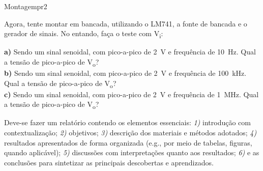 \begin{problem}{Montagem}{pr2}

Agora, tente montar em bancada, utilizando o LM741, a fonte de bancada e o gerador de sinais. No entando, faça o teste com V\textsubscript{i}:

\textbf{a)} Sendo um sinal senoidal, com pico-a-pico de \SI{2}{\volt} e frequência de \SI{10}{\hertz}. Qual a tensão de pico-a-pico de V\textsubscript{o}? \\
\textbf{b)} Sendo um sinal senoidal, com pico-a-pico de \SI{2}{\volt} e frequência de \SI{100}{\kilo\hertz}. Qual a tensão de pico-a-pico de V\textsubscript{o}? \\
\textbf{c)} Sendo um sinal senoidal, com pico-a-pico de \SI{2}{\volt} e frequência de \SI{1}{\mega\hertz}. Qual a tensão de pico-a-pico de V\textsubscript{o}? \\

\end{problem}

\begin{obs}

Deve-se fazer um relatório contendo os elementos essenciais: \textit{1)} introdução com contextualização; \textit{2)} objetivos; \textit{3)} descrição dos materiais e métodos adotados; \textit{4)} resultados apresentados de forma organizada (e.g., por meio de tabelas, figuras, quando aplicável); \textit{5)} discussões com interpretações quanto aos resultados; \textit{6)} e as conclusões para sintetizar as principais descobertas e aprendizados.

\end{obs}

\newpage

\printbibliography


